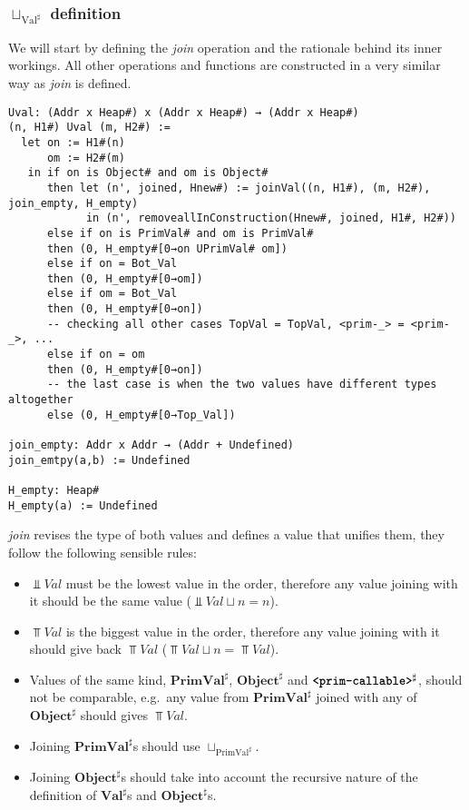 \subsubsection*{\(\sqcup_{\text{Val}^\sharp}\) definition}

We will start by defining the \emph{join} operation and the rationale behind its inner
workings. All other operations and functions are constructed in a very similar way as
\emph{join} is defined.

\begin{verbatim}
Uval: (Addr x Heap#) x (Addr x Heap#) → (Addr x Heap#)
(n, H1#) Uval (m, H2#) :=
  let on := H1#(n)
      om := H2#(m)
   in if on is Object# and om is Object#
      then let (n', joined, Hnew#) := joinVal((n, H1#), (m, H2#), join_empty, H_empty)
            in (n', removeallInConstruction(Hnew#, joined, H1#, H2#))
      else if on is PrimVal# and om is PrimVal#
      then (0, H_empty#[0→on UPrimVal# om])
      else if on = Bot_Val
      then (0, H_empty#[0→om])
      else if om = Bot_Val
      then (0, H_empty#[0→on])
      -- checking all other cases TopVal = TopVal, <prim-_> = <prim-_>, ...
      else if on = om
      then (0, H_empty#[0→on])
      -- the last case is when the two values have different types altogether
      else (0, H_empty#[0→Top_Val])

join_empty: Addr x Addr → (Addr + Undefined)
join_emtpy(a,b) := Undefined

H_empty: Heap#
H_empty(a) := Undefined
\end{verbatim}

\emph{join} revises the type of both values and defines a value that unifies them, they
follow the following sensible rules:

\begin{itemize}
\tightlist
\item \(\Bot{Val}\) must be the lowest value in the order, therefore any value joining
  with it should be the same value (\(\Bot{Val} \sqcup n = n\)).
\item \(\Top{Val}\) is the biggest value in the order, therefore any value joining with it
  should give back \(\Top{Val}\) (\(\Top{Val} \sqcup n = \Top{Val}\)).
\item Values of the same kind, \(\mathbf{PrimVal}^\sharp\), \(\mathbf{Object}^\sharp\) and
  \(\textbf{\texttt{<prim-callable>}}^\sharp\), should not be comparable, e.g.~any value
  from \(\mathbf{PrimVal}^\sharp\) joined with any of \(\mathbf{Object}^\sharp\) should
  gives \(\Top{Val}\).
\item Joining \(\mathbf{PrimVal}^\sharp\)s should use \(\sqcup_{\text{PrimVal}^\sharp}\).
\item Joining \(\mathbf{Object}^\sharp\)s should take into account the recursive nature of
  the definition of \(\mathbf{Val}^\sharp\)s and \(\mathbf{Object}^\sharp\)s.
\end{itemize}


